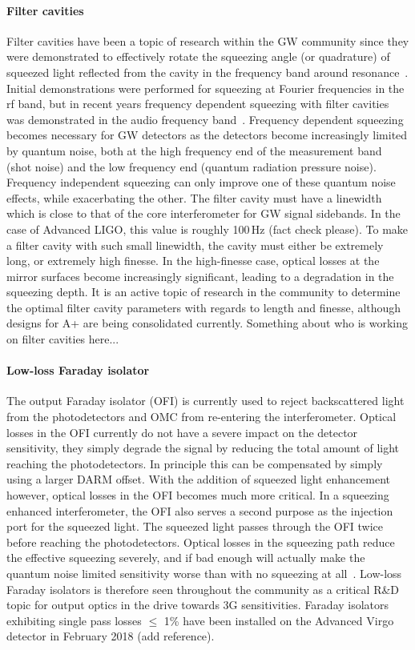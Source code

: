 \paragraph{Filter cavities}
Filter cavities have been a topic of research within the GW community since they were demonstrated to effectively rotate the squeezing angle (or quadrature) of squeezed light reflected from the cavity in the frequency band around resonance~\cite{chelkowski}. Initial demonstrations were performed for squeezing at Fourier frequencies in the rf band, but in recent years frequency dependent squeezing with filter cavities was demonstrated in the audio frequency band~\cite{MITfiltercav}. Frequency dependent squeezing becomes necessary for GW detectors as the detectors become increasingly limited by quantum noise, both at the high frequency end of the measurement band (shot noise) and the low frequency end (quantum radiation pressure noise). Frequency independent squeezing can only improve one of these quantum noise effects, while exacerbating the other. The filter cavity must have a linewidth which is close to that of the core interferometer for GW signal sidebands. In the case of Advanced LIGO, this value is roughly 100\,Hz (fact check please). To make a filter cavity with such small linewidth, the cavity must either be extremely long, or extremely high finesse. In the high-finesse case, optical losses at the mirror surfaces become increasingly significant, leading to a degradation in the squeezing depth. It is an active topic of research in the community to determine the optimal filter cavity parameters with regards to length and finesse, although designs for A+ are being consolidated currently. Something about who is working on filter cavities here... 

\paragraph{Low-loss Faraday isolator}
The output Faraday isolator (OFI) is currently used to reject backscattered light from the photodetectors and OMC from re-entering the interferometer. Optical losses in the OFI currently do not have a severe impact on the detector sensitivity, they simply degrade the signal by reducing the total amount of light reaching the photodetectors. In principle this can be compensated by simply using a larger DARM offset.
With the addition of squeezed light enhancement however, optical losses in the OFI becomes much more critical. In a squeezing enhanced interferometer, the OFI also serves a second purpose as the injection port for the squeezed light. The squeezed light passes through the OFI twice before reaching the photodetectors. Optical losses in the squeezing path reduce the effective squeezing severely, and if bad enough will actually make the quantum noise limited sensitivity worse than with no squeezing at all~\cite{dwyer}. Low-loss Faraday isolators is therefore seen throughout the community as a critical R\&D topic for output optics in the drive towards 3G sensitivities.
Faraday isolators exhibiting single pass losses $\leq$ 1\% have been installed on the Advanced Virgo detector in February 2018 (add reference).

